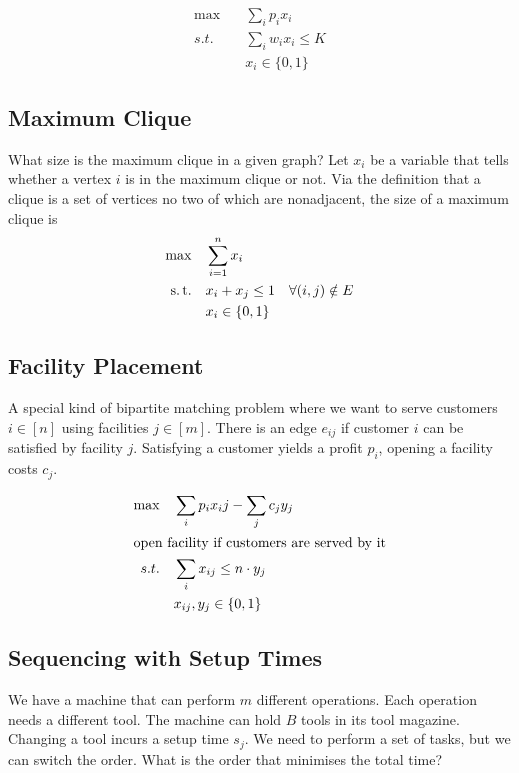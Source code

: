 \begin{align*}
\max \quad & \sum_i p_ix_i\\
s.t.\quad & \sum_i w_i x_i \leq K\\
	& x_i\in \{0,1\}
\end{align*}

\subsection{Maximum Clique}

What size is the maximum clique in a given graph? Let $x_i$ be a variable that tells whether a vertex $i$ is in the maximum clique or not. Via the definition that a clique is a set of vertices no two of which are nonadjacent, the size of a maximum clique is
\begin{align*}
\max \quad & \sum_{i=1}^n x_i\\
\text{s.\,t.} \quad & x_i + x_j \leq 1 & \forall (i,j) \notin E\\
& x_i \in \{0,1\}
\end{align*}

\subsection{Facility Placement}

A special kind of bipartite matching problem where we want to serve customers $i\in [n]$ using facilities $j\in [m]$. There is an edge $e_{ij}$ if customer $i$ can be satisfied by facility $j$. Satisfying a customer yields a profit $p_i$, opening a facility costs $c_j$.

\begin{align*}
\max \quad & \sum_i p_i x_ij - \sum_{j} c_j y_j\\
\intertext{open facility if customers are served by it}
s.t. \quad & \sum_{i} x_{ij} \leq n\cdot y_j\\
	& x_{ij},y_j \in \{0,1\}
\end{align*}

\subsection{Sequencing with Setup Times}

We have a machine that can perform $m$ different operations. Each operation needs a different tool. The machine can hold $B$ tools in its tool magazine. Changing a tool incurs a setup time $s_j$. We need to perform a set of tasks, but we can switch the order. What is the order that minimises the total time?

